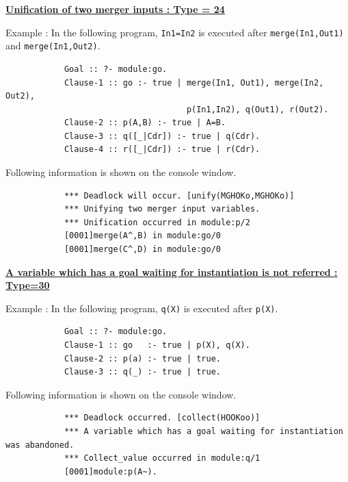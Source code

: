 \noindent\underline{\bf
Unification of two merger inputs : Type = 24}
\vspace{1ex}\par
Example : In the following program, \verb|In1=In2| is executed after
\verb|merge(In1,Out1)| and \verb|merge(In1,Out2)|.
\begin{verbatim}
            Goal :: ?- module:go.
            Clause-1 :: go :- true | merge(In1, Out1), merge(In2, Out2),
                                     p(In1,In2), q(Out1), r(Out2).
            Clause-2 :: p(A,B) :- true | A=B.
            Clause-3 :: q([_|Cdr]) :- true | q(Cdr).
            Clause-4 :: r([_|Cdr]) :- true | r(Cdr).
\end{verbatim}\par
Following information is shown on the console window.
\begin{verbatim}
            *** Deadlock will occur. [unify(MGHOKo,MGHOKo)]
            *** Unifying two merger input variables.
            *** Unification occurred in module:p/2
            [0001]merge(A^,B) in module:go/0
            [0001]merge(C^,D) in module:go/0
\end{verbatim}
\vspace{1ex}

\noindent\underline{\bf
A variable which has a goal waiting for instantiation is
not referred : Type=30}\vspace{1ex}\par
Example : In the following program, \verb|q(X)| is executed after \verb|p(X)|.
\begin{verbatim}
            Goal :: ?- module:go.
            Clause-1 :: go   :- true | p(X), q(X).
            Clause-2 :: p(a) :- true | true.
            Clause-3 :: q(_) :- true | true.
\end{verbatim}\par
Following information is shown on the console window.
\begin{verbatim}
            *** Deadlock occurred. [collect(HOOKoo)]
            *** A variable which has a goal waiting for instantiation was abandoned.
            *** Collect_value occurred in module:q/1
            [0001]module:p(A~).
\end{verbatim}
\vspace{1ex}

